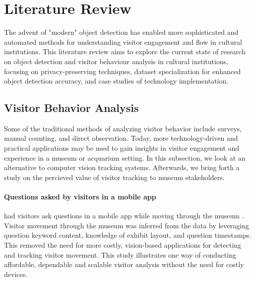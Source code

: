 \section{Literature Review}
The advent of "modern" object detection has enabled more sophisticated and automated methods for understanding visitor engagement and flow in cultural institutions. This literature review aims to explore the current state of research on object detection and visitor behaviour analysis in cultural institutions, focusing on privacy-preserving techniques, dataset specialization for enhanced object detection accuracy, and case studies of technology implementation.

\subsection{Visitor Behavior Analysis}

Some of the traditional methods of analyzing visitor behavior include surveys, manual counting, and direct observation. Today, more technology-driven and practical applications may be used to gain insights in visitor engagement and experience in a museum or acquarium setting. In this subsection, we look at an alternative to computer vision tracking systems. Afterwards, we bring forth a study on the percieved value of visitor tracking to museum stakeholders. 

\paragraph{Questions asked by visitors in a mobile app}
\citeauthor{co2023appquestionairre} had visitors ask questions in a mobile app while moving through the museum \citeyear{co2023appquestionairre}. Visitor movement through the museum was inferred from the data by leveraging question keyword content, knowledge of exhibit layout, and question timestamps. This removed the need for more costly, vision-based applications for detecting and tracking visitor movement. This study illustrates one way of conducting affordable, dependable and scalable visitor analysis without the need for costly devices.

